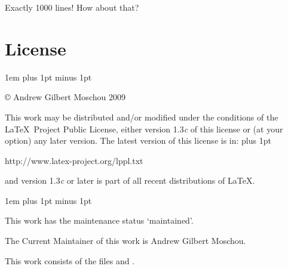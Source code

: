 \documentclass{ltxdockit}
\begin{document}



\noindent Exactly 1000 lines! How about that?

\pagebreak

\section{License}

\setlength\parindent{0pt}
\parskip 1em plus 1pt minus 1pt

© Andrew Gilbert Moschou 2009

This work may be distributed and/or modified under the conditions of
the \LaTeX\ Project Public License, either version 1.3\textit c of
this license or (at your option) any later version.  The latest
version of this license is in:
\parskip 0pt plus 1pt
\begin{center}\ttfamily
  http://www.latex-project.org/lppl.txt
\end{center}
and version 1.3\textit c or later is part of all recent distributions
of \LaTeX.

\parskip 1em plus 1pt minus 1pt

This work has the  maintenance status ‘maintained’.

The Current Maintainer of this work is Andrew Gilbert Moschou.

This work consists of the files  and
.
\end{document}
